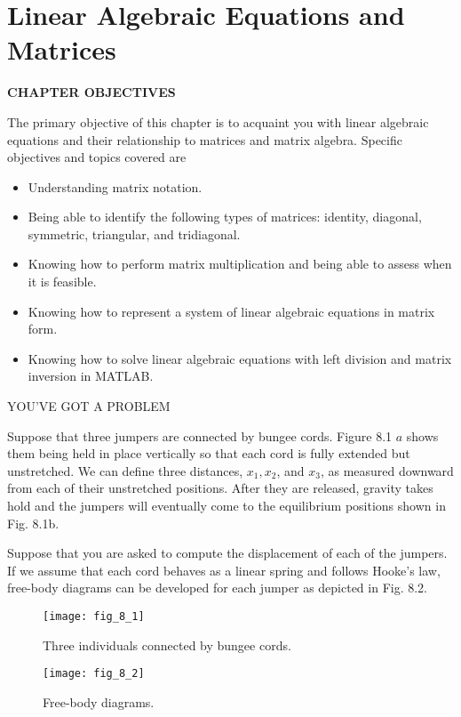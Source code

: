 \documentclass[../main.tex]{subfiles}
\begin{document}
\theoremstyle{definition}

\chapter{Linear Algebraic Equations
and Matrices}
\label{cha8:cha8}
\begin{center}
\Large{\textbf{CHAPTER OBJECTIVES}}
\end{center}

The primary objective of this chapter is to acquaint you with linear algebraic equations and their relationship to matrices and matrix algebra. Specific objectives and topics covered are
\begin{itemize}
\item Understanding matrix notation.
\item Being able to identify the following types of matrices: identity, diagonal, symmetric, triangular, and tridiagonal.
\item Knowing how to perform matrix multiplication and being able to assess when it is feasible.
\item Knowing how to represent a system of linear algebraic equations in matrix form.
\item Knowing how to solve linear algebraic equations with left division and matrix inversion in MATLAB.
\end{itemize}
\bigskip

\Large{YOU'VE GOT A PROBLEM}
\normalsize
\bigskip

Suppose that three jumpers are connected by bungee cords. Figure 8.1 $a$ shows them being held in place vertically so that each cord is fully extended but unstretched. We can define three distances, $x_{1}, x_{2}$, and $x_{3}$, as measured downward from each of their unstretched positions. After they are released, gravity takes hold and the jumpers will eventually come to the equilibrium positions shown in Fig. 8.1b.

Suppose that you are asked to compute the displacement of each of the jumpers. If we assume that each cord behaves as a linear spring and follows Hooke's law, free-body diagrams can be developed for each jumper as depicted in Fig. 8.2.
\newpage

\begin{multicols}{2}

\begin{figure}[H]
	\centering
	\texttt{[image: fig\_8\_1]}
	\caption{\textsf{Three individuals connected by bungee cords.}}
	\label{fig:fig_8_1}
\end{figure}

\begin{figure}[H]
	\centering
	\texttt{[image: fig\_8\_2]}
	\caption{\textsf{Free-body diagrams.}}
	\label{fig:fig_8_2}
\end{figure}

\end{multicols}
\end{document}
